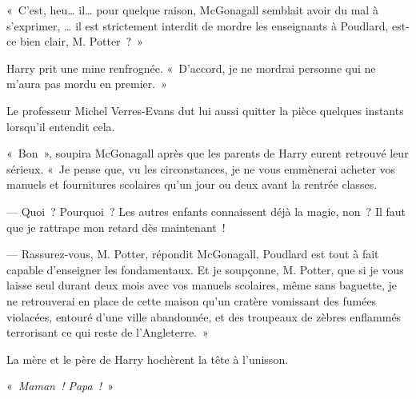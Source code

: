 «~C'est, heu… il… pour quelque raison, McGonagall semblait avoir du mal à s'exprimer, … il est strictement interdit de mordre les enseignants à Poudlard, est-ce bien clair, M. Potter~?~»

Harry prit une mine renfrognée. «~D'accord, je ne mordrai personne qui ne m'aura pas mordu en premier.~»

Le professeur Michel Verres-Evans dut lui aussi quitter la pièce quelques instants lorsqu'il entendit cela.

«~Bon~», soupira McGonagall après que les parents de Harry eurent retrouvé leur sérieux. «~Je pense que, vu les circonstances, je ne vous emmènerai acheter vos manuels et fournitures scolaires qu'un jour ou deux avant la rentrée classes.

--- Quoi~? Pourquoi~? Les autres enfants connaissent déjà la magie, non~?  Il faut que je rattrape mon retard dès maintenant~!

--- Rassurez-vous, M. Potter, répondit McGonagall, Poudlard est tout à fait capable d'enseigner les fondamentaux. Et je soupçonne, M. Potter, que si je vous laisse seul durant deux mois avec vos manuels scolaires, même sans baguette, je ne retrouverai en place de cette maison qu'un cratère vomissant des fumées violacées, entouré d'une ville abandonnée, et des troupeaux de zèbres enflammés terrorisant ce qui reste de l'Angleterre.~»

La mère et le père de Harry hochèrent la tête à l'unisson.

«~\emph{Maman~! Papa~!}~»
